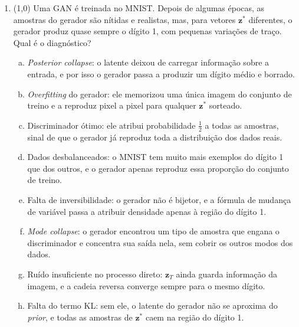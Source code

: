 \documentclass[11pt,a4paper]{article}
\begin{document}
\begin{enumerate}[1)]
\pagebreak
\item (1{,}0) Uma GAN é treinada no MNIST. Depois de algumas épocas, as amostras do gerador são nítidas e realistas, mas, para vetores $\mathbf{z}^{*}$ diferentes, o gerador produz quase sempre o dígito 1, com pequenas variações de traço. Qual é o diagnóstico?
\begin{enumerate}[a)]
    \item \textit{Posterior collapse}: o latente deixou de carregar informação sobre a entrada, e por isso o gerador passa a produzir um dígito médio e borrado.
    \item \textit{Overfitting} do gerador: ele memorizou uma única imagem do conjunto de treino e a reproduz pixel a pixel para qualquer $\mathbf{z}^{*}$ sorteado.
    \item Discriminador ótimo: ele atribui probabilidade $\frac{1}{2}$ a todas as amostras, sinal de que o gerador já reproduz toda a distribuição dos dados reais.
    \item Dados desbalanceados: o MNIST tem muito mais exemplos do dígito 1 que dos outros, e o gerador apenas reproduz essa proporção do conjunto de treino.
    \item Falta de inversibilidade: o gerador não é bijetor, e a fórmula de mudança de variável passa a atribuir densidade apenas à região do dígito 1.
    \item \textit{Mode collapse}: o gerador encontrou um tipo de amostra que engana o discriminador e concentra sua saída nela, sem cobrir os outros modos dos dados.
    \item Ruído insuficiente no processo direto: $\mathbf{z}_T$ ainda guarda informação da imagem, e a cadeia reversa converge sempre para o mesmo dígito.
    \item Falta do termo KL: sem ele, o latente do gerador não se aproxima do \textit{prior}, e todas as amostras de $\mathbf{z}^{*}$ caem na região do dígito 1.
\end{enumerate}


\end{enumerate}
\end{document}
